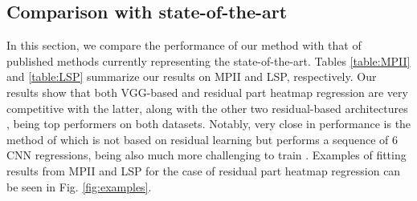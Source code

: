 \documentclass[runningheads]{llncs}
\begin{document}
\subsection{Comparison with state-of-the-art}

In this section, we compare the performance of our method with that of published methods currently representing the state-of-the-art. Tables \ref{table:MPII} and \ref{table:LSP} summarize our results on MPII and LSP, respectively. Our results show that both VGG-based and residual part heatmap regression are very competitive with the latter, along with the other two residual-based architectures \cite{newell2016stacked, insafutdinov2016deepercut}, being top performers on both datasets. Notably, very close in performance is the method of \cite{wei2016convolutional} which is not based on residual learning but performs a sequence of 6 CNN regressions, being also much more challenging to train \cite{wei2016convolutional}. Examples of fitting results from MPII and LSP for the case of residual part heatmap regression can be seen in Fig. \ref{fig:examples}.

  
\end{document}
